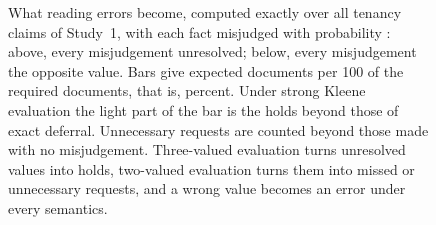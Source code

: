 \begin{figure}[ht]
\centering
{}
\caption{What reading errors become, computed exactly over all \propClaims{} tenancy claims of Study~1, with each fact misjudged with probability \propEps: above, every misjudgement unresolved; below, every misjudgement the opposite value. Bars give expected documents per 100 of the \propRequired{} required documents, that is, percent. Under strong Kleene evaluation the light part of the bar is the holds beyond those of exact deferral. Unnecessary requests are counted beyond those made with no misjudgement. Three-valued evaluation turns unresolved values into holds, two-valued evaluation turns them into missed or unnecessary requests, and a wrong value becomes an error under every semantics.}
\label{fig:fate}
\end{figure}
